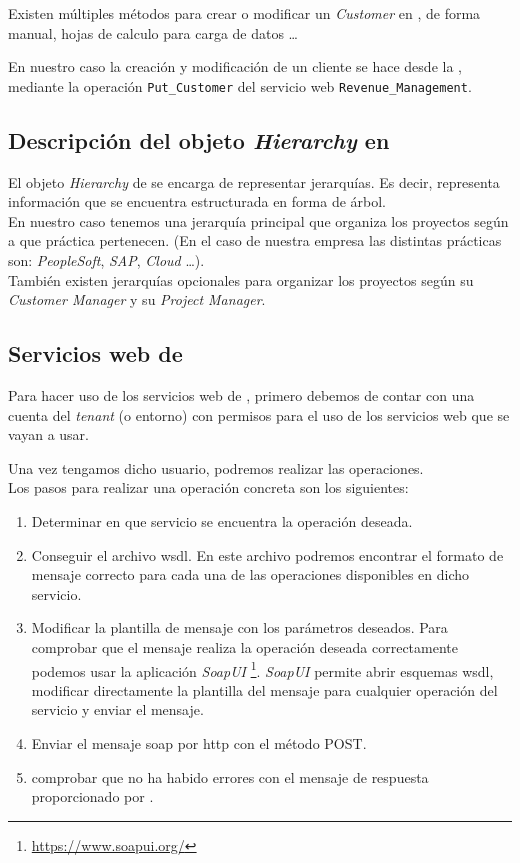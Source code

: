 Existen múltiples métodos para crear o modificar un \textit{Customer} en \wday{}, de forma manual, hojas de calculo para carga de datos \ldots

En nuestro caso la creación y modificación de un cliente se hace desde la \iface{}, 
mediante la operación \texttt{Put\_Customer} del servicio web \texttt{Revenue\_Management}.

\subsection{Descripción del objeto \textit{Hierarchy} en \wday{}}

El objeto \textit{Hierarchy} de \wday{} se encarga de representar jerarquías.
Es decir, representa información que se encuentra estructurada en forma de árbol.\\

En nuestro caso tenemos una jerarquía principal que organiza los proyectos según a que práctica pertenecen. 
(En el caso de nuestra empresa las distintas prácticas son: \textit{PeopleSoft}, \textit{SAP}, \textit{Cloud} \ldots).\\

También existen jerarquías opcionales para organizar los proyectos según su \textit{Customer Manager} y su \textit{Project Manager}.

\subsection{Servicios web de \wday{}}

Para hacer uso de los servicios web de \wday{}, primero debemos de contar con una cuenta del \textit{tenant} (o entorno) con permisos para el uso de los servicios web que se vayan a usar.

Una vez tengamos dicho usuario, podremos realizar las operaciones.\\

Los pasos para realizar una operación concreta son los siguientes:

\begin{enumerate}
	\item Determinar en que servicio se encuentra la operación deseada.
	\item Conseguir el archivo \acrshort{wsdl}. En este archivo podremos encontrar el formato de mensaje correcto para cada una de las operaciones disponibles en dicho servicio.
	\item Modificar la plantilla de mensaje con los parámetros deseados. 
	Para comprobar que el mensaje realiza la operación deseada correctamente podemos usar la aplicación \textit{SoapUI} \footnote{\url{https://www.soapui.org/}}. %
	\textit{SoapUI} permite abrir esquemas \acrshort{wsdl}, modificar directamente la plantilla del mensaje para cualquier operación del servicio y enviar el mensaje.
	\item Enviar el mensaje \acrshort{soap} por \acrshort{http} con el método POST.
	\item comprobar que no ha habido errores con el mensaje de respuesta proporcionado por \wday.
\end{enumerate}


